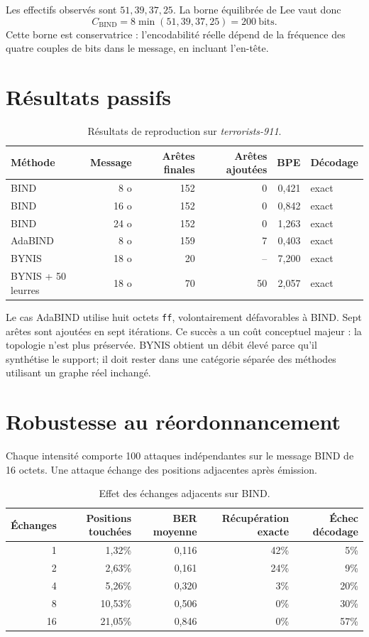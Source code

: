 \documentclass[10pt,a4paper]{article}
\begin{document}
Les effectifs observés sont \(51,39,37,25\). La borne équilibrée de Lee vaut
donc
\[
  C_{\mathrm{BIND}}=8\min(51,39,37,25)=200\ \text{bits}.
\]
Cette borne est conservatrice : l'encodabilité réelle dépend de la fréquence
des quatre couples de bits dans le message, en incluant l'en-tête.

\section{Résultats passifs}

\begin{table}[H]
\centering
\caption{Résultats de reproduction sur \emph{terrorists-911}.}
\begin{tabular}{lrrrrl}
\toprule
Méthode & Message & Arêtes finales & Arêtes ajoutées & BPE & Décodage\\
\midrule
BIND & 8 o  & 152 & 0  & 0,421 & exact\\
BIND & 16 o & 152 & 0  & 0,842 & exact\\
BIND & 24 o & 152 & 0  & 1,263 & exact\\
AdaBIND & 8 o & 159 & 7 & 0,403 & exact\\
BYNIS & 18 o & 20 & -- & 7,200 & exact\\
BYNIS + 50 leurres & 18 o & 70 & 50 & 2,057 & exact\\
\bottomrule
\end{tabular}
\end{table}

Le cas AdaBIND utilise huit octets \texttt{ff}, volontairement défavorables à
BIND. Sept arêtes sont ajoutées en sept itérations. Ce succès a un coût
conceptuel majeur : la topologie n'est plus préservée. BYNIS obtient un débit
élevé parce qu'il synthétise le support; il doit rester dans une catégorie
séparée des méthodes utilisant un graphe réel inchangé.

\section{Robustesse au réordonnancement}

Chaque intensité comporte 100 attaques indépendantes sur le message BIND de
16 octets. Une attaque échange des positions adjacentes après émission.

\begin{table}[H]
\centering
\caption{Effet des échanges adjacents sur BIND.}
\begin{tabular}{rrrrr}
\toprule
Échanges & Positions touchées & BER moyenne & Récupération exacte & Échec décodage\\
\midrule
1  & 1,32\%  & 0,116 & 42\% & 5\%\\
2  & 2,63\%  & 0,161 & 24\% & 9\%\\
4  & 5,26\%  & 0,320 & 3\%  & 20\%\\
8  & 10,53\% & 0,506 & 0\%  & 30\%\\
16 & 21,05\% & 0,846 & 0\%  & 57\%\\
\bottomrule
\end{tabular}
\end{table}
\end{document}

